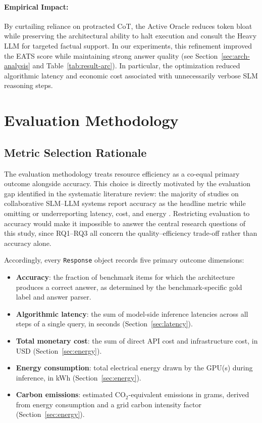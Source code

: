 \paragraph{Empirical Impact:} By curtailing reliance on protracted CoT, the Active Oracle reduces token bloat while preserving the architectural ability to halt execution and consult the Heavy LLM for targeted factual support. In our experiments, this refinement improved the EATS score while maintaining strong answer quality (see Section~\ref{sec:arch-analysis} and Table~\ref{tab:result-arc}). In particular, the optimization reduced algorithmic latency and economic cost associated with unnecessarily verbose SLM reasoning steps.

\section{Evaluation Methodology}
\label{sec:evaluation}

\subsection{Metric Selection Rationale}

The evaluation methodology treats resource efficiency as a co-equal primary outcome alongside accuracy. This choice is directly motivated by the evaluation gap identified in the systematic literature review: the majority of studies on collaborative SLM--LLM systems report accuracy as the headline metric while omitting or underreporting latency, cost, and energy \cite{slrmanuscript2026, energytoken2025}. Restricting evaluation to accuracy would make it impossible to answer the central research questions of this study, since RQ1--RQ3 all concern the quality--efficiency trade-off rather than accuracy alone.

Accordingly, every \texttt{Response} object records five primary outcome dimensions:
\begin{itemize}
    \item \textbf{Accuracy}: the fraction of benchmark items for which the architecture produces a correct answer, as determined by the benchmark-specific gold label and answer parser.
    \item \textbf{Algorithmic latency}: the sum of model-side inference latencies across all steps of a single query, in seconds (Section~\ref{sec:latency}).
    \item \textbf{Total monetary cost}: the sum of direct API cost and infrastructure cost, in USD (Section~\ref{sec:energy}).
    \item \textbf{Energy consumption}: total electrical energy drawn by the GPU(s) during inference, in kWh (Section~\ref{sec:energy}).
    \item \textbf{Carbon emissions}: estimated CO$_2$-equivalent emissions in grams, derived from energy consumption and a grid carbon intensity factor (Section~\ref{sec:energy}).
\end{itemize}

